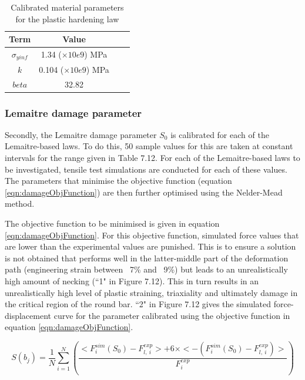 \documentclass[sn-mathphys,Numbered,draft]{sn-jnl}%
\begin{document}
\begin{table}[htb]
	\centering
		\begin{tabular}{cccc} \hline
			Term  & Value  \\ \hline 
            $\sigma_{yinf}$ & 1.34 ($\times10e9$) MPa \\
			$k$ & 0.104 ($\times10e9$) MPa  \\
   		$beta$ & 32.82 &  \\
			\hline
		\end{tabular}
	\caption{Calibrated material parameters for the plastic hardening law}
	\label{tab:material_properties}
\end{table}

\subsubsection{Lemaitre damage parameter}

Secondly, the Lemaitre damage parameter $S_0$ is calibrated for each of the Lemaitre-based laws. To do this, 50 sample values for this are taken at constant intervals for the range given in Table 7.12. For each of the Lemaitre-based laws to be investigated, tensile test simulations are conducted for each of these values. The parameters that minimise the objective function (equation \ref{eqn:damageObjFunction}) are then further optimised using the Nelder-Mead method.

The objective function to be minimised is given in equation \ref{eqn:damageObjFunction}. For this objective function, simulated force values that are lower than the experimental values are punished. This is to ensure a solution is not obtained that performs well in the latter-middle part of the deformation path (engineering strain between ~7\% and ~9\%) but leads to an unrealistically high amount of necking (``1" in Figure 7.12). This in turn results in an unrealistically high level of plastic straining, triaxiality and ultimately damage in the critical region of the round bar. ``2" in Figure 7.12 gives the simulated force-displacement curve for the parameter calibrated using the objective function in equation \ref{eqn:damageObjFunction}.

\begin{equation}
\label{eqn:damageObjFunction}
S(b_j)=\frac{1}{N} \sum_{i=1}^N\left(\frac{<F^{sim}_i(S_0)-F^{exp}_{l,\ i}>+6\times<-\left(F^{sim}_i(S_0)-F^{exp}_{l,\ i}\right)>}{F^{exp}_i}\right)
\end{equation}
\end{document}
